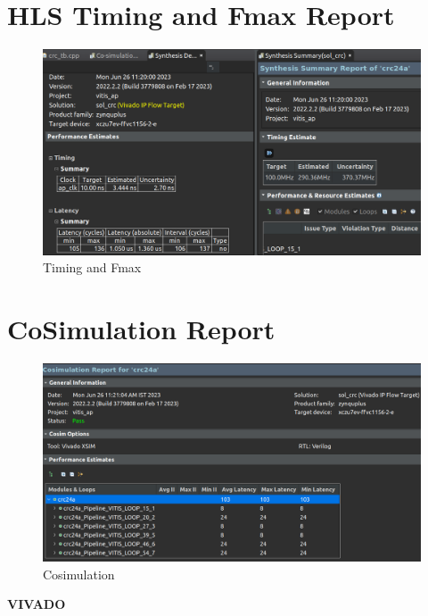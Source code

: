 \documentclass{article}
\begin{document}
\section{HLS Timing and Fmax Report}
\vspace{1cm}
\begin{figure}[h]
    \centering
\includegraphics[width=\textwidth]{figs/p12.png}
    \caption{Timing and Fmax}
    \label{fig:my_label}
\end{figure}

\vspace{15cm}


\section{CoSimulation Report}
\vspace{1cm}
\begin{figure}[h]
    \centering
\includegraphics[width=\textwidth]{figs/p13.png}
    \caption{Cosimulation}
    \label{fig:my_label}
\end{figure}

\vspace{15cm}


\maketitle
\hfill \textbf{VIVADO}
\end{document}
